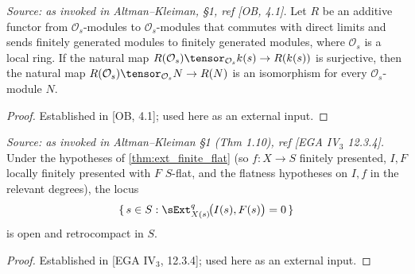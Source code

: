 \begin{theorem}
  \label{thm:ob_nakayama_iso}
  \textit{Source: as invoked in Altman--Kleiman, §1, ref [OB, 4.1].}
  Let $R$ be an additive functor from $\mathcal{O}_s$-modules to
  $\mathcal{O}_s$-modules that commutes with direct limits and sends finitely
  generated modules to finitely generated modules, where $\mathcal{O}_s$ is a
  local ring. If the natural map $R(\mathcal{O}_s) \tensor_{\mathcal{O}_s} k(s)
  \to R(k(s))$ is surjective, then the natural map
  $R(\mathcal{O}_s) \tensor_{\mathcal{O}_s} N \to R(N)$ is an isomorphism for
  every $\mathcal{O}_s$-module $N$.
  \begin{proof}
    Established in [OB, 4.1]; used here as an external input.
  \end{proof}
\end{theorem}

\begin{theorem}
  \label{thm:ega_ext_vanishing_open}
  \textit{Source: as invoked in Altman--Kleiman §1 (Thm 1.10), ref [EGA IV$_3$ 12.3.4].}
  Under the hypotheses of \cref{thm:ext_finite_flat} (so $f : X \to S$ finitely
  presented, $I, F$ locally finitely presented with $F$ $S$-flat, and the flatness
  hypotheses on $I, f$ in the relevant degrees), the locus
  \[
    \{\, s \in S : \sExt^q_{X(s)}\!\big(I(s), F(s)\big) = 0 \,\}
  \]
  is open and retrocompact in $S$.
  \begin{proof}
    Established in [EGA IV$_3$, 12.3.4]; used here as an external input.
  \end{proof}
\end{theorem}

